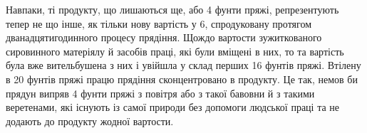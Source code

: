 Навпаки, ті  продукту, що лишаються ще, або 4 фунти пряжі, репрезентують тепер не що інше, як
тільки нову вартість
у 6, спродуковану протягом дванадцятигодинного процесу прядіння. Щождо вартости
зужиткованого сировинного матеріялу й засобів праці, які були вміщені в них, то та вартість була вже
вительбушена з них і увійшла у склад перших 16 фунтів пряжі. Втілену в 20 фунтів пряжі працю
прядіння сконцентровано
в  продукту. Це так, немов би прядун випряв 4 фунти пряжі з повітря або з такої бавовни й з
такими веретенами, які
існують із самої природи без допомоги людської праці та не додають до продукту жодної вартости.
